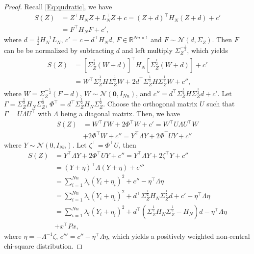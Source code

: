 \documentclass[letterpaper, 10 pt, conference]{ieeeconf}  %
\begin{document}
\begin{proof}
   Recall \eqref{Eq:qudratic}, we have
    \begin{equation*}
        \begin{aligned}
        S(Z)&= Z^\top H_N Z+L_N^\top Z+c=\left( Z+d\right)^\top H_N(Z+d) +c' \\
        &= F^\top H_N F+c',
        \end{aligned}
    \end{equation*}
    where $d=\frac{1}{2}H_N^{-1}L_N$, $c'=c-d^\top H_N d$, $F\in \mathbb{R}^{Nn\times1}$ and $F\sim
\mathcal{N}(d,\Sigma_Z)$. Then $F$ can be be normalized by subtracting $d$ and left multiply $\Sigma_Z^{-\frac{1}{2}}$, which yields 
\begin{equation*}
    \begin{aligned}
        S(Z)&= \left[\Sigma_Z^{\frac{1}{2}}\left( W\!+\!d\right)\right]^\top \! H_N \left[\Sigma_Z^{\frac{1}{2}}\left( W\!+\!d\right)\right]+c'\\
        &= W^\top \Sigma_Z^{\frac{1}{2}} H \Sigma_Z^{\frac{1}{2}}W +2d^\top \Sigma_Z^{\frac{1}{2}} H \Sigma_Z^{\frac{1}{2}}W +c'',
    \end{aligned}
\end{equation*} 
where $W=\Sigma_Z^{-\frac{1}{2}}\left( F-d\right)$, $W \sim \mathcal{N}(\mathbf{0},I_{Nn})$, and $c''=d^\top \Sigma_Z^{\frac{1}{2}} H \Sigma_Z^{\frac{1}{2}}d+c'$.
Let $\Gamma=\Sigma_Z^{\frac{1}{2}} H_N \Sigma_Z^{\frac{1}{2}}$, $\Phi
^\top =d^\top \Sigma_Z^{\frac{1}{2}} H_N \Sigma_Z^{\frac{1}{2}}$. Choose the orthogonal matrix $U$ such that $\Gamma= U\Lambda U^\top$ with $\Lambda$ being a diagonal matrix. Then, we have
\begin{equation*}
    \begin{aligned}
        S(Z)&=W^\top \Gamma W+ 2 \Phi
        ^\top W+c'= W^\top U \Lambda U^\top W \\
        & +2\Phi
        ^\top W+c'' =Y^\top \Lambda Y+2\Phi^\top UY+c''
    \end{aligned}
\end{equation*}
where $Y\sim \mathcal{N}(0,I_{Nn})$. Let $\zeta^\top=\Phi^\top U$, then
\begin{equation*}
    \begin{aligned}
        S(Z)&= Y^\top \Lambda Y+2\Phi^\top UY+c''= Y^\top \Lambda Y+2\zeta^\top Y+c''\\&= (Y+\eta)^\top \Lambda (Y+\eta)+c'''\\&=\sum_{i=1}^{Nn}\lambda_i\left( Y_i+\eta_i \right)^2+c''-\eta^\top \Lambda \eta\\
        &=\sum_{i=1}^{Nn}\lambda_i\left( Y_i+\eta_i \right)^2+d^\top \Sigma_Z^{\frac{1}{2}} H_N \Sigma_Z^{\frac{1}{2}}d+c'- \eta^\top \Lambda \eta \\
        &=\sum_{i=1}^{Nn}\lambda_i\left( Y_i+\eta_i \right)^2+d^\top (\Sigma_Z^{\frac{1}{2}} H_N \Sigma_Z^{\frac{1}{2}}-H_N)d-\eta^\top\Lambda \eta\\&+x^\top Px ,
    \end{aligned}
\end{equation*}
where $\eta=-\Lambda^{-1}\zeta$, $c'''=c''-\eta^\top \Lambda \eta$, which yields a positively weighted non-central chi-square distribution.
\end{proof}
\end{document}
